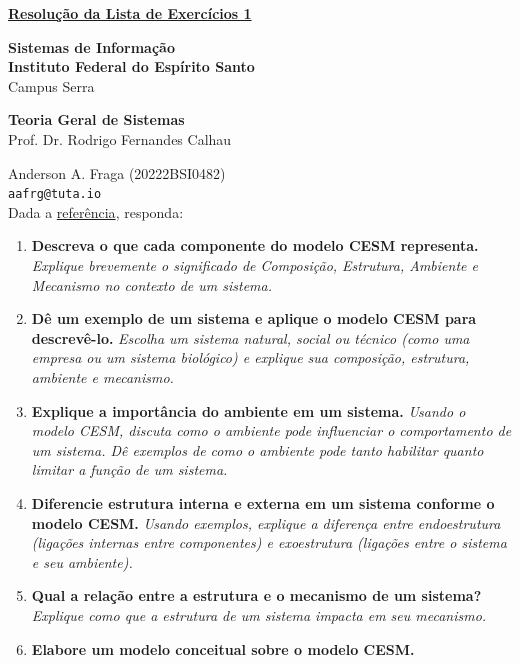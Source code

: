 \documentclass{article}
\begin{document}
\underline{\textbf{Resolução da Lista de Exercícios 1}}\par
\textbf{Sistemas de Informação}\\
\textbf{Instituto Federal do Espírito Santo}\\
Campus Serra\par
\textbf{Teoria Geral de Sistemas}\\
Prof. Dr. Rodrigo Fernandes Calhau\par
Anderson A. Fraga (20222BSI0482)\\
\texttt{aafrg@tuta.io}\\  %

Dada a \href{http://eprints.rclis.org/20102/1/Kern_Sistemismo_Enancib2011.pdf}{referência}, responda:
\begin{enumerate}
    \item \textbf{Descreva o que cada componente do modelo CESM representa.} \textit{Explique brevemente o significado de Composição, Estrutura, Ambiente e Mecanismo no contexto de um sistema.}
    \item \textbf{Dê um exemplo de um sistema e aplique o modelo CESM para descrevê-lo.} \textit{Escolha um sistema natural, social ou técnico (como uma empresa ou um sistema biológico) e explique sua composição, estrutura, ambiente e mecanismo.}
    \item \textbf{Explique a importância do ambiente em um sistema.} \textit{Usando o modelo CESM, discuta como o ambiente pode influenciar o comportamento de um sistema. Dê exemplos de como o ambiente pode tanto habilitar quanto limitar a função de um sistema.}
    \item \textbf{Diferencie estrutura interna e externa em um sistema conforme o modelo CESM.} \textit{Usando exemplos, explique a diferença entre endoestrutura (ligações internas entre componentes) e exoestrutura (ligações entre o sistema e seu ambiente).}
    \item \textbf{Qual a relação entre a estrutura e o mecanismo de um sistema?} \textit{Explique como que a estrutura de um sistema impacta em seu mecanismo.}
    \item \textbf{Elabore um modelo conceitual sobre o modelo CESM.}
\end{enumerate}\vspace{0.5cm}
\end{document}

